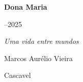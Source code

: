 \thispagestyle{empty}
\begin{center}
    \vspace*{\fill}

    {\fontsize{30}{34}\selectfont\bfseries Dona Maria\par}

    \vspace{12pt}

    {\fontsize{16}{20}--2025\par}

    \vspace{18pt}

    {\large\itshape Uma vida entre mundos\par}

    \vspace*{\fill}

    {\normalsize Marcos Aurélio Vieira\par}

    \vspace{12pt}

    {\normalsize Cascavel \par}
\end{center}

\cleardoublepage
